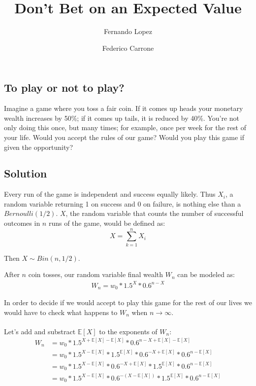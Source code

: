 \documentclass[12pt]{article}
\title{Don't Bet on an Expected Value}
\author{Fernando Lopez \and Federico Carrone}
\begin{document}
\maketitle
{}

\subsection{To play or not to play?}

Imagine a game where you toss a fair coin. If it comes up heads your monetary wealth increases by 50\%; if it comes up tails, it is reduced by 40\%. You’re not only doing this once, but many times; for example, once per week for the rest of your life. Would you accept the rules of our game? Would you play this game if given the opportunity?

\subsection{Solution}
Every run of the game is independent and success equally likely. Thus $X_i$, a random variable returning 1 on success and 0 on failure, is nothing else than a $Bernoulli(1/2)$. $X$, the random variable that counts the number of successful outcomes in $n$ runs of the game, would be defined as:
\begin{equation*}
 X = \sum\limits_{k=1}^{n} X_i
\end{equation*}

Then $X \sim Bin(n, 1/2)$.

After $n$ coin tosses, our random variable final wealth $W_n$ can be modeled as:
\begin{align}
  \begin{equation*}
    W_n = w_0 * 1.5^X * 0.6^{n-X}
  \end{equation*}
\end{align}

In order to decide if we would accept to play this game for the rest of our lives we would have to check what happens to $W_n$ when $n \rightarrow \infty$.
\\\\

Let's add and substract $\mathbb{E}[X]$ to the exponents of $W_n$:
\begin{equation*}
  \begin{split}
    W_n &= w_0 * 1.5^{X + \mathbb{E}[X] - \mathbb{E}[X]} * 0.6^{n - X + \mathbb{E}[X] - \mathbb{E}[X]} \\
    & = w_0 *  1.5^{X - \mathbb{E}[X]}*1.5^{\mathbb{E}[X]} * 0.6^{- X + \mathbb{E}[X]} * 0.6^{n - \mathbb{E}[X]} \\
    & = w_0 *  1.5^{X - \mathbb{E}[X]} * 0.6^{- X + \mathbb{E}[X]} * 1.5^{\mathbb{E}[X]} * 0.6^{n - \mathbb{E}[X]}\\
    & = w_0 *  1.5^{X - \mathbb{E}[X]} * 0.6^{- (X - \mathbb{E}[X])} * 1.5^{\mathbb{E}[X]} * 0.6^{n - \mathbb{E}[X]}

  \end{split}
\end{equation*}
\end{document}
